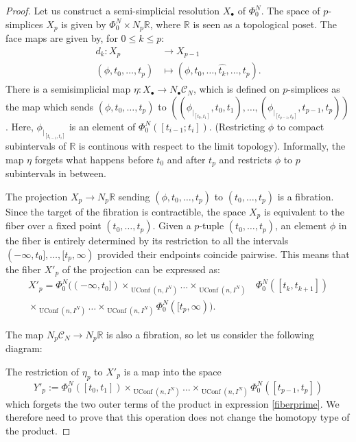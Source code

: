 \documentclass[12pt]{amsart}
\theoremstyle{plain}
\theoremstyle{definition}
\theoremstyle{remark}
\DeclareMathOperator{\UConf}{UConf}
\newcommand{\C}{\mathcal{C}}
\begin{document}
\begin{proof}
Let us construct a semi-simplicial resolution $X_\bullet$ of $\Phi_0^N.$
The space of $p$-simplices $X_p$ is given by $\Phi_0^N\times N_p\mathbb{R}$, where $\mathbb{R}$ is seen as a topological poset.
The face maps are given by, for $0\leq k \leq p$:
\begin{align*}
    d_k: X_p&\rightarrow X_{p-1}\\
    (\phi,t_0,\dots, t_p) &\mapsto (\phi,t_0,\dots, \hat{t_k},\dots, t_p).
\end{align*}
There is a semisimplicial map $\eta: X_\bullet\rightarrow N_\bullet\C_N$, which is defined on $p$-simplices as the map which sends $(\phi,t_0,\dots, t_p)$ to $\left((\phi_{\vert_{[t_0,t_1]}},t_0,t_1),\dots,(\phi_{\vert_{[t_{p-1},t_p]}},t_{p-1},t_p)\right)$. 
Here, $\phi_{\vert_{[t_{i-1},t_i]}}$ is an element of $\Phi_0^N([t_{i-1};t_i])$.
(Restricting $\phi$ to compact subintervals of $\mathbb{R}$ is continous with respect to the limit topology).
Informally, the map $\eta$ forgets what happens before $t_0$ and after $t_p$ and restricts $\phi$ to $p$ subintervals in between.

The projection $X_p\rightarrow N_p\mathbb{R}$ sending $(\phi, t_0,\dots, t_p)$ to $(t_0,\dots, t_p)$ is a fibration. 
Since the target of the fibration is contractible, the space $X_p$ is equivalent to the fiber over a fixed point $(t_0,\dots, t_p)$.
Given a $p$-tuple $(t_0,\dots,t_p)$, an element $\phi$ in the fiber is entirely determined by its restriction to all the intervals $(-\infty,t_0],\dots,[t_p,\infty)$ provided their endpoints coincide pairwise.
This means that the fiber $X'_p$ of the projection can be expressed as:
\begin{align}
X'_p =\Phi_0^N((-\infty,t_0])\times_{\UConf(n,I^N)}\dots\times_{\UConf(n,I^N)}&\Phi_0^N([t_k,t_{k+1}]) \label{fiberprime}\\
\times_{\UConf(n,I^N)}\dots\times_{\UConf(n,I^N)}\Phi_0^N([t_p,\infty)) \nonumber.
\end{align}

The map $N_p\C_N\rightarrow N_p\mathbb{R}$ is also a fibration, so let us consider the following diagram:
\begin{center}
\end{center}
The restriction of $\eta_p$ to $X'_p$ is a map into the space
\[Y'_p:= \Phi_0^N([t_0,t_1])\times_{\UConf(n,I^N)}\dots\times_{\UConf(n,I^N)}\Phi_0^N([t_{p-1},t_{p}])\]
which forgets the two outer terms of the product in expression \ref{fiberprime}. 
We therefore need to prove that this operation does not change the homotopy type of the product.


\end{proof}
\end{document}
